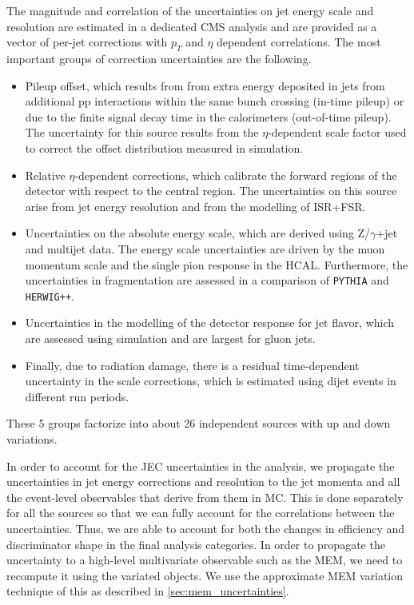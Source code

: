 The magnitude and correlation of the uncertainties on jet energy scale and resolution are estimated in a dedicated CMS analysis and are provided as a vector of per-jet corrections with $p_T$ and $\eta$ dependent correlations. The most important groups of correction uncertainties are the following.
\begin{itemize}
\item Pileup offset, which results from from extra energy deposited in jets from additional pp interactions within the same bunch crossing (in-time pileup) or due to the finite signal decay time in the calorimeters (out-of-time pileup). The uncertainty for this source results from the $\eta$-dependent scale factor used to correct the offset distribution measured in simulation.
\item Relative $\eta$-dependent corrections, which calibrate the forward regions of the detector with respect to the central region. The uncertainties on this source arise from jet energy resolution and from the modelling of ISR+FSR.
\item Uncertainties on the absolute energy scale, which are derived using Z/$\gamma$+jet and multijet data. The energy scale uncertainties are driven by the muon momentum scale and the single pion response in the HCAL. Furthermore, the uncertainties in fragmentation are assessed in a comparison of \texttt{PYTHIA} and \texttt{HERWIG++}.
\item Uncertainties in the modelling of the detector response for jet flavor, which are assessed using simulation and are largest for gluon jets.
\item Finally, due to radiation damage, there is a residual time-dependent uncertainty in the scale corrections, which is estimated using dijet events in different run periods.
\end{itemize}
These 5 groups factorize into about 26 independent sources with up and down variations.

In order to account for the JEC uncertainties in the analysis, we propagate the uncertainties in jet energy corrections and resolution to the jet momenta and all the event-level observables that derive from them in MC. This is done separately for all the sources so that we can fully account for the correlations between the uncertainties. Thus, we are able to account for both the changes in efficiency and discriminator shape in the final analysis categories.
In order to propagate the uncertainty to a high-level multivariate observable such as the MEM, we need to recompute it using the variated objects. We use the approximate MEM variation technique of this as described in \cref{sec:mem_uncertainties}.


